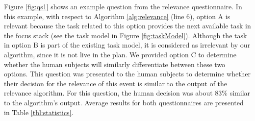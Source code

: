 \documentclass{article}
\begin{document}
Figure \ref{fig:qs1} shows an example question from the relevance
questionnaire. In this example, with respect to Algorithm \ref{alg:relevance}
(line 6), option A is relevant because {\color{red}the task related to this
option provides the next available task in the focus stack (see the task model in
Figure \ref{fig:taskModel}). Although the task in option B is part of the
existing task model, it is considered as irrelevant by our algorithm, since it
is not live in the plan.} We provided option C to determine whether the human
subjects will similarly differentiate between these two options. This question
was presented to the human subjects to determine whether their decision for the
relevance of this event is similar to the output of the relevance algorithm. For
this question, the human decision was about 83\% similar to the algorithm's
output. Average results for both questionnaires are presented in Table
\ref{tbl:statistics}.

% 

% 
\end{document}
